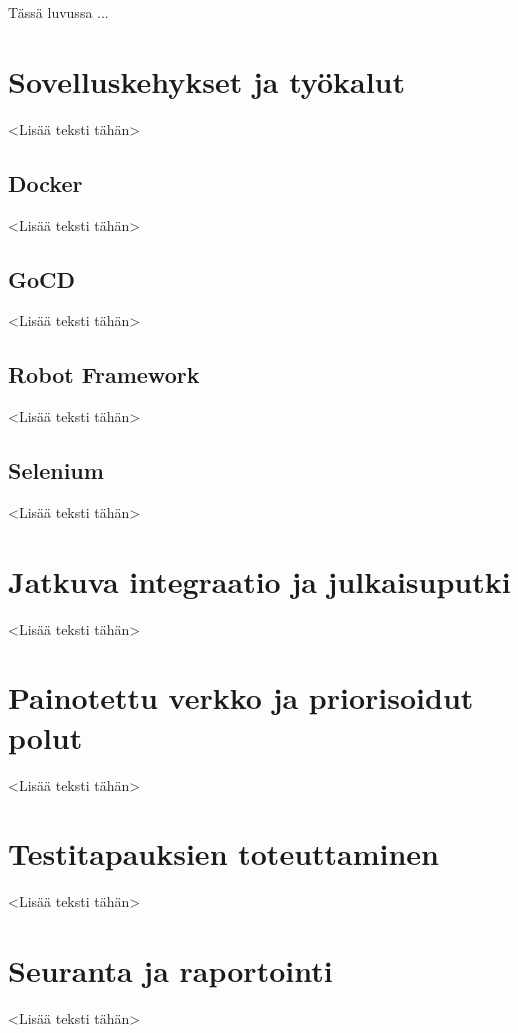 Tässä luvussa ...

\section{Sovelluskehykset ja työkalut}

<Lisää teksti tähän>

  \subsection{Docker}

  <Lisää teksti tähän>

  \subsection{GoCD}

  <Lisää teksti tähän>

  \subsection{Robot Framework}

  <Lisää teksti tähän>

  \subsection{Selenium}

  <Lisää teksti tähän>

\section{Jatkuva integraatio ja julkaisuputki}

<Lisää teksti tähän>

\section{Painotettu verkko ja priorisoidut polut}

<Lisää teksti tähän>

\section{Testitapauksien toteuttaminen}

<Lisää teksti tähän>

\section{Seuranta ja raportointi}

<Lisää teksti tähän>

